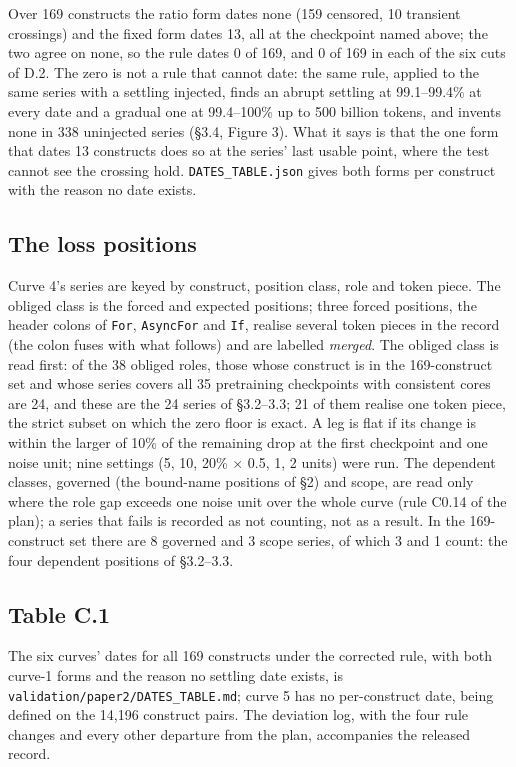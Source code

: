 \documentclass{article}
\begin{document}
Over 169 constructs the ratio form dates none (159 censored, 10 transient crossings) and the fixed form dates 13, all at the checkpoint named above; the two agree on none, so the rule dates 0 of 169, and 0 of 169 in each of the six cuts of D.2. The zero is not a rule that cannot date: the same rule, applied to the same series with a settling injected, finds an abrupt settling at 99.1--99.4\% at every date and a gradual one at 99.4--100\% up to 500 billion tokens, and invents none in 338 uninjected series (\S3.4, Figure 3). What it says is that the one form that dates 13 constructs does so at the series' last usable point, where the test cannot see the crossing hold. \texttt{DATES\_TABLE.json} gives both forms per construct with the reason no date exists.

\subsection{The loss positions}

Curve 4's series are keyed by construct, position class, role and token piece. The obliged class is the forced and expected positions; three forced positions, the header colons of \texttt{For}, \texttt{AsyncFor} and \texttt{If}, realise several token pieces in the record (the colon fuses with what follows) and are labelled \emph{merged}. The obliged class is read first: of the 38 obliged roles, those whose construct is in the 169-construct set and whose series covers all 35 pretraining checkpoints with consistent cores are 24, and these are the 24 series of \S3.2--3.3; 21 of them realise one token piece, the strict subset on which the zero floor is exact. A leg is flat if its change is within the larger of 10\% of the remaining drop at the first checkpoint and one noise unit; nine settings (5, 10, 20\% $\times$ 0.5, 1, 2 units) were run. The dependent classes, governed (the bound-name positions of \S2) and scope, are read only where the role gap exceeds one noise unit over the whole curve (rule C0.14 of the plan); a series that fails is recorded as not counting, not as a result. In the 169-construct set there are 8 governed and 3 scope series, of which 3 and 1 count: the four dependent positions of \S3.2--3.3.

\subsection{Table C.1}

The six curves' dates for all 169 constructs under the corrected rule, with both curve-1 forms and the reason no settling date exists, is \texttt{validation/paper2/DATES\_TABLE.md}; curve 5 has no per-construct date, being defined on the 14,196 construct pairs. The deviation log, with the four rule changes and every other departure from the plan, accompanies the released record.
\end{document}
